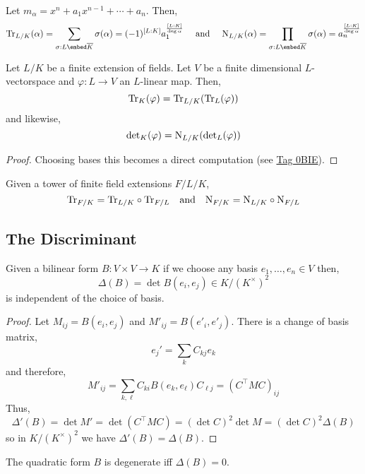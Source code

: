 \documentclass[12pt]{article}
\begin{document}
\begin{cor}
Let $m_\alpha = x^n + a_{1} x^{n-1} + \cdots + a_n$. Then,
\[ \Tr_{L/K}(\alpha) = \sum_{\sigma : L \embed \overline{K}} \sigma(\alpha) = (-1)^{[L:K]} a_1^{\frac{[L : K]}{\deg{\alpha}}} \quad \text{ and } \quad \Nm_{L/K}(\alpha) = \prod_{\sigma : L \embed \overline{K}} \sigma(\alpha) = a_n^{\frac{[L:K]}{\deg{\alpha}}}\]
\end{cor}


\begin{lemma}
Let $L/K$ be a finite extension of fields. Let $V$ be a finite dimensional $L$-vectorspace and $\varphi : L \to V$ an $L$-linear map. Then,
\[ \mathrm{Tr}_K(\varphi) = \mathrm{Tr}_{L/K}(\mathrm{Tr}_L(\varphi)) \]
and likewise,
\[ \mathrm{det}_K(\varphi) = \mathrm{N}_{L/K}(\mathrm{det}_L(\varphi)) \]
\end{lemma}

\begin{proof}
Choosing bases this becomes a direct computation (see \href{https://stacks.math.columbia.edu/tag/0BII}{Tag 0BIE}).
\end{proof}

\begin{cor}
Given a tower of finite field extensions $F / L / K$,
\[ \mathrm{Tr}_{F/K} = \mathrm{Tr}_{L/K} \circ \mathrm{Tr}_{F/L} \quad \text{and} \quad \mathrm{N}_{F/K} = \mathrm{N}_{L/K} \circ \mathrm{N}_{F/L} \] 
\end{cor}

\subsection{The Discriminant}

\begin{lemma}
Given a bilinear form $B : V \times V \to K$ if we choose any basis $e_1, \dots, e_n \in V$ then,
\[ \Delta(B) = \det{B(e_i, e_j)} \in K / (K^\times)^2 \]
is independent of the choice of basis.
\end{lemma}

\begin{proof}
Let $M_{ij} = B(e_i, e_j)$ and $M'_{ij} = B(e'_i, e'_j)$.
There is a change of basis matrix,
\[ e_j' = \sum_{k} C_{kj} e_k \]
and therefore,
\[ M'_{ij} = \sum_{k,\ell} C_{k i} B(e_k, e_\ell) C_{\ell j} =  (C^\top M C)_{ij} \]
Thus,
\[ \Delta'(B) = \det{M'} = \det{(C^\top M C)} = (\det{C})^2 \det{M} = (\det{C})^2 \Delta(B) \]
so in $K / (K^\times)^2$ we have $\Delta'(B) = \Delta(B)$.
\end{proof}

\begin{lemma}
The quadratic form $B$ is degenerate iff $\Delta(B) = 0$.
\end{lemma}
\end{document}
